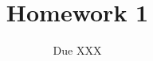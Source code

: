\documentclass[12pt]{article}
\title{Homework 1}
\date{Due XXX}
\begin{document}
\maketitle

\section{}
\end{document}
